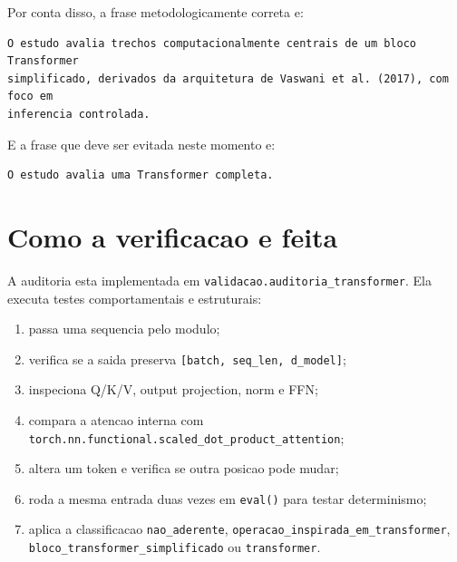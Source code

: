 Por conta disso, a frase metodologicamente correta e:



\begin{Verbatim}[fontsize=\small,breaklines=true,label=text]
O estudo avalia trechos computacionalmente centrais de um bloco Transformer
simplificado, derivados da arquitetura de Vaswani et al. (2017), com foco em
inferencia controlada.
\end{Verbatim}



E a frase que deve ser evitada neste momento e:



\begin{Verbatim}[fontsize=\small,breaklines=true,label=text]
O estudo avalia uma Transformer completa.
\end{Verbatim}



\section{Como a verificacao e feita}




A auditoria esta implementada em \texttt{validacao.\allowbreak{}auditoria\_\allowbreak{}transformer}. Ela executa testes comportamentais e estruturais:


\begin{enumerate}
\item passa uma sequencia pelo modulo;
\item verifica se a saida preserva \texttt{[batch, seq\_\allowbreak{}len, d\_\allowbreak{}model]};
\item inspeciona Q/K/V, output projection, norm e FFN;
\item compara a atencao interna com \texttt{torch.\allowbreak{}nn.\allowbreak{}functional.\allowbreak{}scaled\_\allowbreak{}dot\_\allowbreak{}product\_\allowbreak{}attention};
\item altera um token e verifica se outra posicao pode mudar;
\item roda a mesma entrada duas vezes em \texttt{eval()} para testar determinismo;
\item aplica a classificacao \texttt{nao\_\allowbreak{}aderente}, \texttt{operacao\_\allowbreak{}inspirada\_\allowbreak{}em\_\allowbreak{}transformer},
\texttt{bloco\_\allowbreak{}transformer\_\allowbreak{}simplificado} ou \texttt{transformer}.
\end{enumerate}


